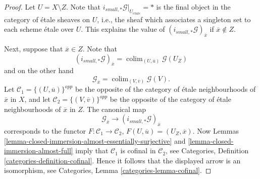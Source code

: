 \documentclass[10pt,a4paper]{amsart}
\theoremstyle{plain}
\theoremstyle{definition}
\theoremstyle{remark}
\numberwithin{equation}{subsection}
\def\colim{\mathop{\mathrm{colim}}\nolimits}
\def\etale{{\acute{e}tale}}
\begin{document}
\begin{proof}
Let $U = X \setminus Z$.
Note that $i_{small, *}\mathcal{G}|_{U_\etale} = *$ is the final
object in the category of \'etale sheaves on $U$, i.e., the sheaf
which associates a singleton set to each scheme \'etale over $U$.
This explains the value of $(i_{small, *}\mathcal{G})_{\overline{x}}$
if $\overline{x} \not \in Z$.

\medskip\noindent
Next, suppose that $\overline{x} \in Z$. Note that
$$
(i_{small, *}\mathcal{G})_{\overline{x}}
=
\colim_{(U, \overline{u})} \mathcal{G}(U_Z)
$$
and on the other hand
$$
\mathcal{G}_{\overline{x}}
=
\colim_{(V, \overline{v})} \mathcal{G}(V).
$$
Let $\mathcal{C}_1 = \{(U, \overline{u})\}^{opp}$ be the opposite of the
category of \'etale neighbourhoods of $\overline{x}$ in $X$, and let
$\mathcal{C}_2 = \{(V, \overline{v})\}^{opp}$ be the opposite of the
category of \'etale neighbourhoods of $\overline{x}$ in $Z$. The canonical map
$$
\mathcal{G}_{\overline{x}}
\longrightarrow
(i_{small, *}\mathcal{G})_{\overline{x}}
$$
corresponds to the functor $F : \mathcal{C}_1 \to \mathcal{C}_2$,
$F(U, \overline{u}) = (U_Z, \overline{x})$. Now
Lemmas \ref{lemma-closed-immersion-almost-essentially-surjective} and
\ref{lemma-closed-immersion-almost-full}
imply that $\mathcal{C}_1$ is cofinal in $\mathcal{C}_2$, see
Categories, Definition \ref{categories-definition-cofinal}.
Hence it follows that the displayed arrow is an isomorphism, see
Categories, Lemma \ref{categories-lemma-cofinal}.
\end{proof}
\end{document}

